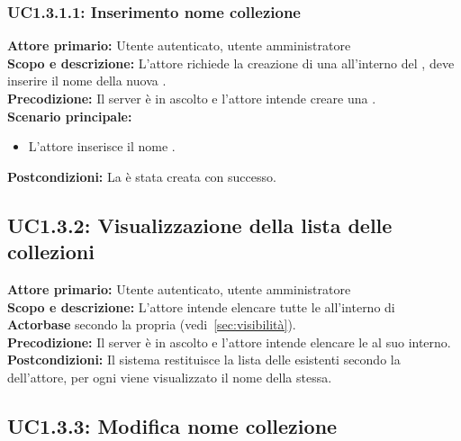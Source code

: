 \documentclass{scalatekids-article}
\begin{document}
\subsubsection{UC1.3.1.1: Inserimento nome collezione}

\textbf{Attore primario:} Utente autenticato, utente amministratore\\
\textbf{Scopo e descrizione:} L'attore richiede la creazione di una  all'interno del , deve inserire il nome della nuova .\\
\textbf{Precodizione:} Il server è in ascolto e l'attore intende creare una .\\
\textbf{Scenario principale:}
\begin{itemize}
\item L'attore inserisce il nome .
\end{itemize}
\textbf{Postcondizioni:} La  è stata creata con successo.

\subsection{UC1.3.2: Visualizzazione della lista delle collezioni}

\textbf{Attore primario:} Utente autenticato, utente amministratore\\
\textbf{Scopo e descrizione:} L'attore intende elencare tutte le  all'interno di \textbf{Actorbase} secondo la propria  (vedi~\ref{sec:visibilità}).\\
\textbf{Precodizione:} Il server è in ascolto e l'attore intende elencare le  al suo interno.\\
\textbf{Postcondizioni:} Il sistema restituisce la lista delle  esistenti secondo la  dell'attore, per ogni  viene visualizzato il nome della  stessa.

\subsection{UC1.3.3: Modifica nome collezione}
\end{document}
